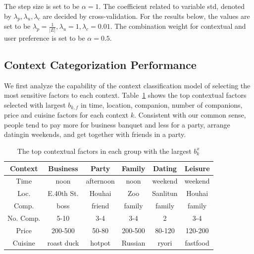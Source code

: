 \documentclass[preprint,12pt]{elsarticle}
\begin{document}
The step size is set to be $\alpha=1$. The coefficient related to variable std, denoted by $\lambda_p,\lambda_u,\lambda_c$ are decided by cross-validation. For the results below, the values are set to be $\lambda_p=\frac{1}{|E|},\lambda_u=1,\lambda_c=0.01$. The combination weight for contextual and user preference is set to be $\alpha=0.5$.

\subsection{Context Categorization Performance}
We first analyze the capability of the context classification model of selecting the most sensitive factors to each context. Table~\ref{tab:factor} shows the top contextual factors selected with largest $b_{k,f}$ in time, location, companion, number of companions, price and cuisine factors for each context $k$. Consistent with our common sense, people tend to pay more for business banquet and less for a party, arrange datingin weekends, and get together with friends in a party.
\begin{table}\label{tab:factor}
\footnotesize
\centering
\caption{The top contextual factors in each group with the largest $b^x_k$}
\begin{tabular}{|c|c|c|c|c|c|}
  \hline
  Context & Business & Party & Family & Dating & Leisure \\\hline\hline
  Time & noon & afternoon & noon & weekend & weekend \\\hline
  Loc. & E.40th St. & Houhai& Zoo & Sanlitun & Houhai \\\hline
  Comp. & boss & friend & family & family & family \\\hline
  No. Comp. & 5-10 & 3-4 & 3-4 & 2 & 3-4 \\\hline
  Price & 200-500 & 50-80 & 200-500 & 80-120 & 120-200 \\\hline
  Cuisine & roast duck & hotpot &  Russian & ryori & fastfood \\\hline
\end{tabular}
\end{table}
\end{document}
